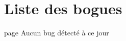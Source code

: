 \chapter{Liste des bogues}
\hypertarget{bug}{}\label{bug}

\begin{DoxyRefList}
\item[page \doxylink{index}{CAMS} ]\label{bug__bug000001}%
%
Aucun bug détecté à ce jour 
\end{DoxyRefList}